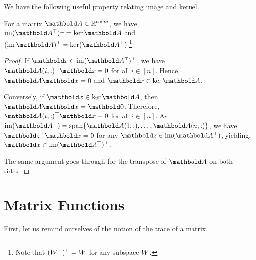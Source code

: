 We have the following useful property relating image and kernel.

\begin{lem}
For a matrix $\mA \in \R^{n \times m}$, we have $\compl{\im(\trans{\mA})} = \ker\mA$ and $\compl{(\im\mA)} = \ker(\trans{\mA})$.\footnote{Note that $(W^\bot)^\bot = W$ for any subspace $W$.}
\end{lem}
\begin{proof}
If $\vx \in \compl{\im(\trans{\mA})}$, we have $\trans{\mA(i,:)}\vx = 0$ for all $i \in [n]$. Hence, $\mA\vx = 0$ and $\vx \in \ker\mA$.

Conversely, if $\vx \in \ker\mA$, then $\mA\vx = \vZero$. Therefore, $\trans{\mA(i,:)}\vx = 0$ for all $i \in [n]$. As $\im(\trans{\mA}) = \vspan\{\mA(1,:), \dots, \mA(n,:)\}$, we have $\trans{\vz}\vx = 0$ for any $\vz \in \im(\trans{\mA})$, yielding, $\vx \in \compl{\im(\trans{\mA})}$.

The same argument goes through for the transpose of $\mA$ on both sides.
\end{proof}

\section{Matrix Functions}

First, let us remind ourselves of the notion of the trace of a matrix.

